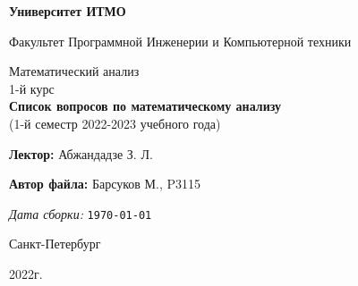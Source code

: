 \thispagestyle{empty}
\begin{center}
    \textbf{Университет ИТМО}

    \vspace{1em}
    Факультет Программной Инженерии и Компьютерной техники

    \vspace{16em}
    
    {\Large Математический анализ}\\[1em]
    {\Large 1-й курс}\\[1em]
    {\Large \textbf{Список вопросов по математическому анализу}}\\[1em]
    (1-й семестр 2022-2023 учебного года)
\end{center}

\vspace{12em}

\begin{flushright}
    \textbf{Лектор:} Абжандадзе З. Л.
    
    \textbf{Автор файла: } Барсуков М., P3115
\end{flushright}
\vspace{8em}
\vspace{\fill}

\begin{center}
\emph{Дата сборки:} \texttt{\today}
\vspace{2em}

Санкт-Петербург

2022г.
\end{center}
